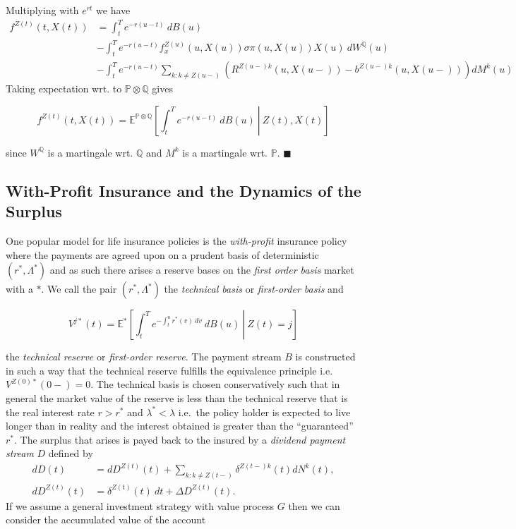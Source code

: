 \documentclass[a4paper,12pt,openany]{book}
\begin{document}
Multiplying with \(e^{rt}\) we have
\begin{align*}
f^{Z(t)}(t,X(t))&=\int_t^Te^{-r(u-t)}\ dB(u)\\
&-\int_t^Te^{-r(u-t)}f_x^{Z(u)}(u,X(u))\sigma \pi(u,X(u))X(u)\ dW^\mathbb Q(u)\\
&-\int_t^Te^{-r(u-t)}\sum_{k:k\ne Z(u-)}\left(R^{Z(u-)k}(u,X(u-))-b^{Z(u-)k}(u,X(u-))\right)dM^k(u)
\end{align*}
Taking expectation wrt. to \(\mathbb P\otimes \mathbb Q\) gives

\[
f^{Z(t)}(t,X(t))=\mathbb E^{\mathbb P \otimes \mathbb Q}\left[\left.\int_t^Te^{-r(u-t)}\ dB(u)\ \right\vert\ Z(t),X(t) \right]
\]

since \(W^\mathbb Q\) is a martingale wrt. \(\mathbb Q\) and \(M^k\) is a martingale wrt. \(\mathbb P\). \(\blacksquare\)

\hypertarget{with-profit-insurance-and-the-dynamics-of-the-surplus}{%
\subsection{With-Profit Insurance and the Dynamics of the Surplus}\label{with-profit-insurance-and-the-dynamics-of-the-surplus}}

One popular model for life insurance policies is the \emph{with-profit} insurance policy where the payments are agreed upon on a prudent basis of deterministic \((r^*,\Lambda ^*)\) and as such there arises a reserve bases on the \emph{first order basis} market with a \(*\). We call the pair \((r^*,\Lambda ^*)\) the \emph{technical basis} or \emph{first-order basis} and

\[
V^{j*}(t)=\mathbb E^*\left[\left.\int_t^Te^{-\int_t^u r^*(v)\ dv}\ dB(u)\ \right\vert\ Z(t)=j\right]
\]

the \emph{technical reserve} or \emph{first-order reserve}. The payment stream \(B\) is constructed in such a way that the technical reserve fulfills the equivalence principle i.e.~\(V^{Z(0)*}(0-)=0\). The technical basis is chosen conservatively such that in general the market value of the reserve is less than the technical reserve that is the real interest rate \(r>r^*\) and \(\lambda^*<\lambda\) i.e.~the policy holder is expected to live longer than in reality and the interest obtained is greater than the ``guaranteed'' \(r^*\). The surplus that arises is payed back to the insured by a \emph{dividend payment stream} \(D\) defined by
\begin{align*}
dD(t)&=dD^{Z(t)}(t)+\sum_{k:k\ne Z(t-)}\delta^{Z(t-)k}(t)dN^k(t),\\
dD^{Z(t)}(t)&=\delta^{Z(t)}(t)\ dt+\Delta D^{Z(t)}(t).
\end{align*}
If we assume a general investment strategy with value process \(G\) then we can consider the accumulated value of the account
\end{document}
